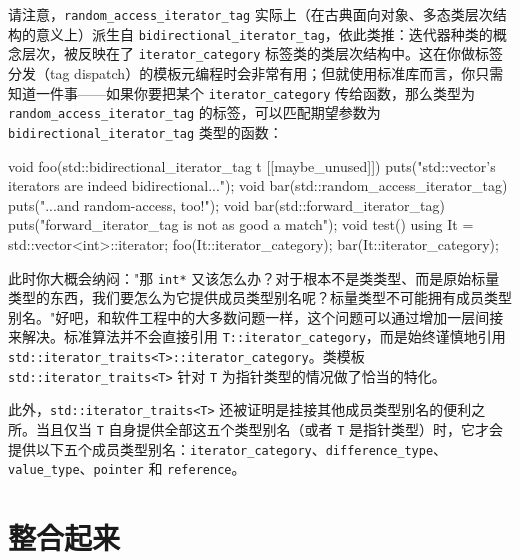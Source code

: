 请注意，\texttt{random\_\allowbreak{}access\_\allowbreak{}iterator\_\allowbreak{}tag} 实际上（在古典面向对象、多态类层次结构的意义上）派生自 \texttt{bidirectional\_\allowbreak{}iterator\_\allowbreak{}tag}，依此类推：迭代器种类的概念层次，被反映在了 \texttt{iterator\_\allowbreak{}category} 标签类的类层次结构中。这在你做标签分发（tag dispatch）的模板元编程时会非常有用；但就使用标准库而言，你只需知道一件事——如果你要把某个 \texttt{iterator\_\allowbreak{}category} 传给函数，那么类型为 \texttt{random\_\allowbreak{}access\_\allowbreak{}iterator\_\allowbreak{}tag} 的标签，可以匹配期望参数为 \texttt{bidirectional\_\allowbreak{}iterator\_\allowbreak{}tag} 类型的函数：

\begin{codebox}[cpp]
    void foo(std::bidirectional_iterator_tag t [[maybe_unused]])
    {
      puts("std::vector's iterators are indeed bidirectional...");
    }
    void bar(std::random_access_iterator_tag)
    {
      puts("...and random-access, too!");
    }
    void bar(std::forward_iterator_tag)
    {
      puts("forward_iterator_tag is not as good a match");
    }
    void test()
    {
      using It = std::vector<int>::iterator;
      foo(It::iterator_category{});
      bar(It::iterator_category{});
    }
\end{codebox}

此时你大概会纳闷："那 \texttt{int*} 又该怎么办？对于根本不是类类型、而是原始标量类型的东西，我们要怎么为它提供成员类型别名呢？标量类型不可能拥有成员类型别名。"好吧，和软件工程中的大多数问题一样，这个问题可以通过增加一层间接来解决。标准算法并不会直接引用 \texttt{T::\allowbreak{}iterator\_\allowbreak{}category}，而是始终谨慎地引用 \texttt{std::\allowbreak{}iterator\_\allowbreak{}traits<\allowbreak{}T>\allowbreak{}::\allowbreak{}iterator\_\allowbreak{}category}。类模板 \texttt{std::\allowbreak{}iterator\_\allowbreak{}traits<\allowbreak{}T>\allowbreak{}} 针对 \texttt{T} 为指针类型的情况做了恰当的特化。

此外，\texttt{std::\allowbreak{}iterator\_\allowbreak{}traits<\allowbreak{}T>\allowbreak{}} 还被证明是挂接其他成员类型别名的便利之所。当且仅当 \texttt{T} 自身提供全部这五个类型别名（或者 \texttt{T} 是指针类型）时，它才会提供以下五个成员类型别名：\texttt{iterator\_\allowbreak{}category}、\texttt{difference\_\allowbreak{}type}、\texttt{value\_\allowbreak{}type}、\texttt{pointer} 和 \texttt{reference}。

\section{整合起来}

